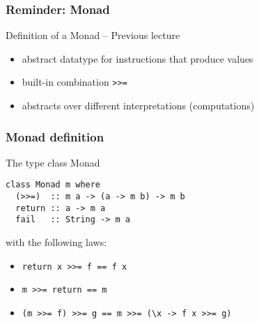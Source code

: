 \documentclass[pdftex,aspectratio=169]{beamer}
\author[Gabriel Radanne]{Dr. Gabriel Radanne}
\subtitle
{Monad Transformers}
\begin{document}
\begin{frame}
  \titlepage
\end{frame}

\begin{frame}
  \frametitle{Reminder: Monad}
  \begin{block}{Definition of a Monad -- Previous lecture}
    \begin{itemize}
    \item abstract datatype for instructions that produce values
    \item built-in combination \lstinline{>>=}
    \item abstracts over different interpretations (computations)
    \end{itemize}
  \end{block}
\end{frame}

\begin{frame}[fragile]
  \frametitle{Monad definition}
  \begin{block}{The type class Monad}
\begin{lstlisting}
class Monad m where
  (>>=)  :: m a -> (a -> m b) -> m b
  return :: a -> m a
  fail   :: String -> m a
\end{lstlisting}

with the following laws:
\begin{itemize}
\item \lstinline{return x >>= f == f x}
\item \lstinline{m >>= return == m}
\item \lstinline{(m >>= f) >>= g == m >>= (\x -> f x >>= g)}
\end{itemize}

\end{block}
\end{frame}
\end{document}
